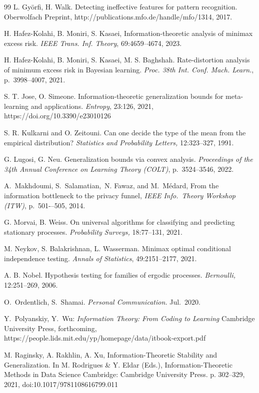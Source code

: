 \documentclass[11pt]{article}
\begin{document}
\begin{thebibliography}{99}
L. Gy\"orfi, H.  Walk. 
Detecting ineffective features for pattern recognition.
Oberwolfach Preprint, http://publications.mfo.de/handle/mfo/1314, 2017. 



 H. Hafez-Kolahi, B. Moniri, S. Kasaei, Information-theoretic analysis of minimax excess risk. \emph{IEEE Trans. Inf. Theory},   69:4659--4674, 2023. 

 H. Hafez-Kolahi, B. Moniri, S. Kasaei, M. S. Baghshah. Rate-distortion analysis of minimum excess risk in Bayesian learning.  \emph{Proc. 38th Int. Conf. Mach. Learn.}, p.\ 3998--4007, 2021. 

 S. T.  Jose, O. Simeone. Information-theoretic generalization bounds for meta-learning and applications. \emph{Entropy},   23:126, 2021,  https://doi.org/10.3390/e23010126


S. R. Kulkarni and O. Zeitouni.
Can one decide the type of the mean from the empirical distribution?
{\it Statistics and Probability Letters,} 12:323--327, 1991.

 G. Lugosi, G. Neu.  Generalization bounds via convex analysis. \emph{Proceedings of the 34th Annual Conference on Learning Theory (COLT)}, p.\  3524--3546, 2022. 


A.~Makhdoumi, S.~Salamatian,~N. Fawaz, and M.~M\'edard,  From the
information bottleneck to the privacy funnel,  \emph{IEEE Info.\ Theory
  Workshop (ITW)},  p.~501-–505, 2014. 

G. Morvai, B. Weiss.
On universal algorithms for classifying and predicting stationary processes.
{\it Probability Surveys,} 18:77--131, 2021.

M. Neykov,  S. Balakrishnan, L. Wasserman.
Minimax optimal conditional independence testing.
{\it Annals of Statistics}, 49:2151--2177, 2021.

A. B. Nobel.
Hypothesis testing for families of ergodic processes.
{\it Bernoulli,} 12:251--269, 2006.


 O.~Ordentlich, S.~Shamai. \emph{Personal Communication.} Jul.\ 2020.


Y.~Polyanskiy, Y.~Wu: \emph{Information Theory: From Coding to Learning} Cambridge University Press, forthcoming, https://people.lids.mit.edu/yp/homepage/data/itbook-export.pdf 

M. Raginsky, A. Rakhlin, A.  Xu, Information-Theoretic Stability and Generalization. In M. Rodrigues \& Y. Eldar (Eds.), Information-Theoretic Methods in Data Science Cambridge: Cambridge University Press. p. 302--329, 2021,   doi:10.1017/9781108616799.011


\end{thebibliography}
\end{document}

